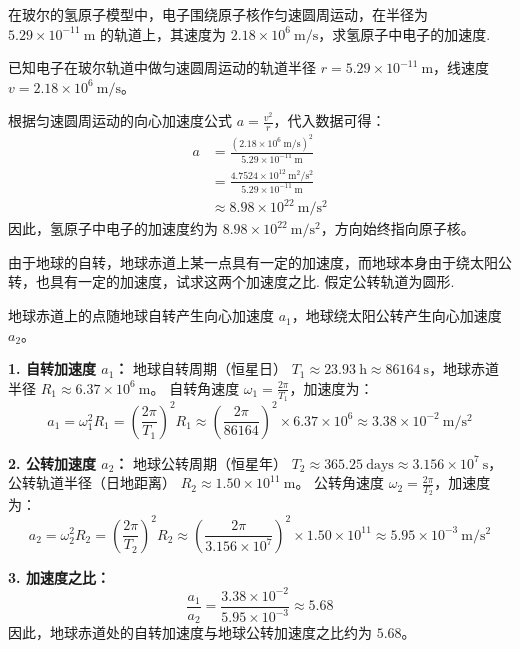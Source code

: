 \begin{exercise}\label{ex:2.7}
在玻尔的氢原子模型中，电子围绕原子核作匀速圆周运动，在半径为 $5.29 \times 10^{-11} \ \mathrm{m}$ 的轨道上，其速度为 $2.18 \times 10^6 \ \mathrm{m/s}$，求氢原子中电子的加速度.
\end{exercise}
\begin{solution}
已知电子在玻尔轨道中做匀速圆周运动的轨道半径 $r = 5.29 \times 10^{-11} \ \mathrm{m}$，线速度 $v = 2.18 \times 10^6 \ \mathrm{m/s}$。

根据匀速圆周运动的向心加速度公式 $a = \frac{v^2}{r}$，代入数据可得：
\begin{align*}
a &= \frac{(2.18 \times 10^6 \ \mathrm{m/s})^2}{5.29 \times 10^{-11} \ \mathrm{m}} \\
  &= \frac{4.7524 \times 10^{12} \ \mathrm{m^2/s^2}}{5.29 \times 10^{-11} \ \mathrm{m}} \\
  &\approx 8.98 \times 10^{22} \ \mathrm{m/s^2}
\end{align*}
因此，氢原子中电子的加速度约为 $8.98 \times 10^{22} \ \mathrm{m/s^2}$，方向始终指向原子核。
\end{solution}

\begin{exercise}\label{ex:2.8}
由于地球的自转，地球赤道上某一点具有一定的加速度，而地球本身由于绕太阳公转，也具有一定的加速度，试求这两个加速度之比. 假定公转轨道为圆形.
\end{exercise}
\begin{solution}
地球赤道上的点随地球自转产生向心加速度 $a_1$，地球绕太阳公转产生向心加速度 $a_2$。

\textbf{1. 自转加速度 $a_1$：}
地球自转周期（恒星日） $T_1 \approx 23.93 \ \mathrm{h} \approx 86164 \ \mathrm{s}$，地球赤道半径 $R_1 \approx 6.37 \times 10^6 \ \mathrm{m}$。
自转角速度 $\omega_1 = \frac{2\pi}{T_1}$，加速度为：
$$ a_1 = \omega_1^2 R_1 = \left( \frac{2\pi}{T_1} \right)^2 R_1 \approx \left( \frac{2\pi}{86164} \right)^2 \times 6.37 \times 10^6 \approx 3.38 \times 10^{-2} \ \mathrm{m/s^2} $$

\textbf{2. 公转加速度 $a_2$：}
地球公转周期（恒星年） $T_2 \approx 365.25 \ \mathrm{days} \approx 3.156 \times 10^7 \ \mathrm{s}$，公转轨道半径（日地距离） $R_2 \approx 1.50 \times 10^{11} \ \mathrm{m}$。
公转角速度 $\omega_2 = \frac{2\pi}{T_2}$，加速度为：
$$ a_2 = \omega_2^2 R_2 = \left( \frac{2\pi}{T_2} \right)^2 R_2 \approx \left( \frac{2\pi}{3.156 \times 10^7} \right)^2 \times 1.50 \times 10^{11} \approx 5.95 \times 10^{-3} \ \mathrm{m/s^2} $$

\textbf{3. 加速度之比：}
$$ \frac{a_1}{a_2} = \frac{3.38 \times 10^{-2}}{5.95 \times 10^{-3}} \approx 5.68 $$
因此，地球赤道处的自转加速度与地球公转加速度之比约为 $5.68$。
\end{solution}

